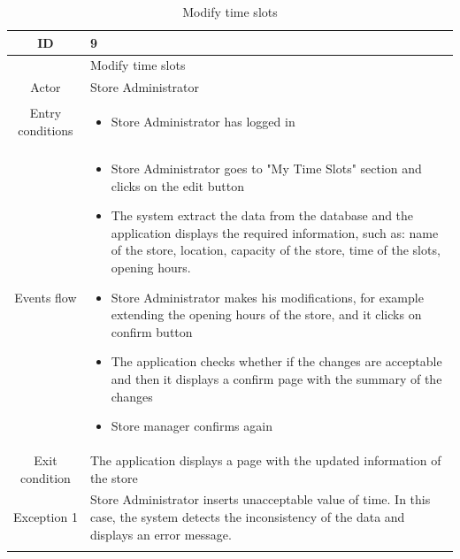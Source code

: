 \documentclass[table, 12pt]{article}
\begin{document}
\begin{longtable}{|c| p{10cm}|}
    \hline ID        & 9                                                                                                                                                     \\
    \hline
                     & Modify time slots                                                                                                                                     \\
    \hline
    Actor            & Store Administrator                                                                                                                                   \\
    \hline
    Entry conditions & \begin{itemize}
        \item Store Administrator has logged in
    \end{itemize}                                                                                                                            \\
    \hline
    Events flow      & \begin{itemize}[nosep,after=\strut]
        \item Store Administrator goes to "My Time Slots" section and clicks on the edit button
        \item The system extract the data from the database and the application displays the required information, such as: name of the store, location, capacity of the store, time of the slots, opening hours.
        \item Store Administrator makes his modifications, for example extending the opening hours of the store, and it clicks on confirm button
        \item The application checks whether if the changes are acceptable and then it displays a confirm page with the summary of the changes
        \item Store manager confirms again
    \end{itemize}                                                                                                                            \\
    \hline
    Exit condition   & The application displays a page with the updated information of the store
    \\
    \hline
    \hline
    Exception 1      & Store Administrator inserts unacceptable value of time. In this case, the system detects the inconsistency of the data and displays an error message. \\
    \hline
    \caption{Modify time slots}                                                                                                                                              \\
\end{longtable}
\end{document}
